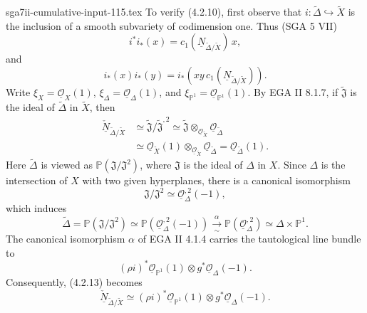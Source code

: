 \begin{filecontents*}{sga7ii-cumulative-input-115.tex}
To verify (4.2.10), first observe that
$i:\widetilde\Delta\hookrightarrow\widetilde X$ is the inclusion of a
smooth subvariety of codimension one.  Thus (SGA 5 VII)
\begin{equation}\tag{4.2.11}
i^*i_*(x)=c_1(\underline N_{\widetilde\Delta/\widetilde X})\,x,
\end{equation}
and
\begin{equation}\tag{4.2.12}
i_*(x)i_*(y)
=i_*\!\left(xy\,c_1(\underline N_{\widetilde\Delta/\widetilde X})\right).
\end{equation}
Write
$\xi_X=\underline{\mathcal O}_X(1)$,
$\xi_\Delta=\underline{\mathcal O}_\Delta(1)$, and
$\xi_{\mathbb P^1}=\underline{\mathcal O}_{\mathbb P^1}(1)$.
By EGA II 8.1.7, if $\widetilde{\mathfrak J}$ is the ideal of
$\widetilde\Delta$ in $\widetilde X$, then
\begin{equation}\tag{4.2.13}
\begin{aligned}
\underline{\check N}_{\widetilde\Delta/\widetilde X}
&\simeq\widetilde{\mathfrak J}/\widetilde{\mathfrak J}^{,2}
 \simeq\widetilde{\mathfrak J}
       \otimes_{\underline{\mathcal O}_{\widetilde X}}
       \underline{\mathcal O}_{\widetilde\Delta}\\
&\simeq\underline{\mathcal O}_{\widetilde X}(1)
       \otimes_{\underline{\mathcal O}_{\widetilde X}}
       \underline{\mathcal O}_{\widetilde\Delta}
 =\underline{\mathcal O}_{\widetilde\Delta}(1).
\end{aligned}
\end{equation}
Here $\widetilde\Delta$ is viewed as
$\mathbb P(\mathfrak J/\mathfrak J^2)$, where $\mathfrak J$ is the ideal of
$\Delta$ in $X$.  Since $\Delta$ is the intersection of $X$ with two given
hyperplanes, there is a canonical isomorphism
\[
\mathfrak J/\mathfrak J^2\simeq
\underline{\mathcal O}_\Delta^{,2}(-1),
\]
which induces
\[
\widetilde\Delta=\mathbb P(\mathfrak J/\mathfrak J^2)
\simeq\mathbb P(\underline{\mathcal O}_\Delta^{,2}(-1))
\xrightarrow[\sim]{\alpha}
\mathbb P(\underline{\mathcal O}_\Delta^{,2})
\simeq\Delta\times\mathbb P^1.
\]
The canonical isomorphism $\alpha$ of EGA II 4.1.4 carries the tautological
line bundle to
\[
(\rho i)^*\underline{\mathcal O}_{\mathbb P^1}(1)
\otimes g^*\underline{\mathcal O}_\Delta(-1).
\]
Consequently, (4.2.13) becomes
\begin{equation}\tag{4.2.14}
\underline{\check N}_{\widetilde\Delta/\widetilde X}
\simeq(\rho i)^*\underline{\mathcal O}_{\mathbb P^1}(1)
       \otimes g^*\underline{\mathcal O}_\Delta(-1).
\end{equation}


\end{filecontents*}
